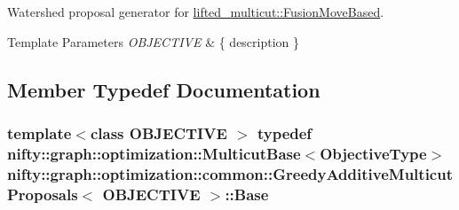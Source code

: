 Watershed proposal generator for \hyperlink{classnifty_1_1graph_1_1optimization_1_1lifted__multicut_1_1FusionMoveBased}{lifted\+\_\+multicut\+::\+Fusion\+Move\+Based}. 


\begin{DoxyTemplParams}{Template Parameters}
{\em O\+B\+J\+E\+C\+T\+I\+V\+E} & \{ description \} \\
\hline
\end{DoxyTemplParams}


\subsection{Member Typedef Documentation}
\hypertarget{classnifty_1_1graph_1_1optimization_1_1common_1_1GreedyAdditiveMulticutProposals_a903eacc5a19cb47916995019e4db2e0e}{}
\subsubsection[{Base}]{\setlength{\rightskip}{0pt plus 5cm}template$<$class O\+B\+J\+E\+C\+T\+I\+V\+E $>$ typedef nifty\+::graph\+::optimization\+::\+Multicut\+Base$<${\bf Objective\+Type}$>$ {\bf nifty\+::graph\+::optimization\+::common\+::\+Greedy\+Additive\+Multicut\+Proposals}$<$ O\+B\+J\+E\+C\+T\+I\+V\+E $>$\+::{\bf Base}}\label{classnifty_1_1graph_1_1optimization_1_1common_1_1GreedyAdditiveMulticutProposals_a903eacc5a19cb47916995019e4db2e0e}
\hypertarget{classnifty_1_1graph_1_1optimization_1_1common_1_1GreedyAdditiveMulticutProposals_aaee332dfc9ee0e30897cbc1e37a6cff0}{}
